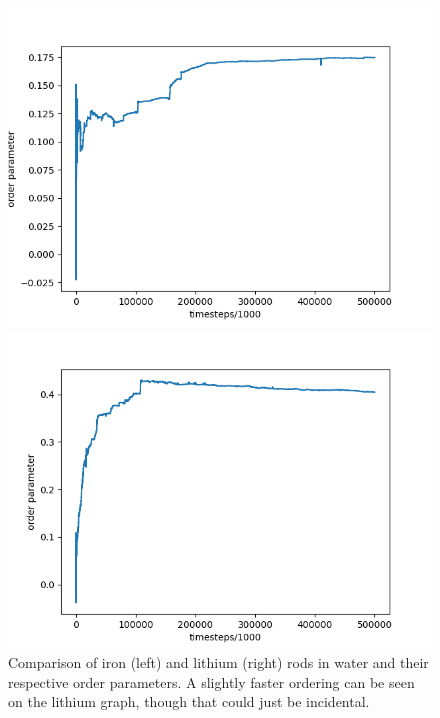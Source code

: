 \begin{figure}[h]
\begin{minipage}[tc]{0.50\textwidth}
    \hspace{-0.2\textwidth}
    \includegraphics[width=1.3\textwidth]{data/med_comp2_L.png}
  \end{minipage}
  \hfill
  \begin{minipage}[tc]{0.50\textwidth}
    \includegraphics[width=1.3\textwidth]{data/med_comp2_R.png}
  \end{minipage}
    \caption{Comparison of iron (left) and lithium (right) rods in water and their respective order parameters. A slightly faster ordering can be seen on the lithium graph, though that could just be incidental.}
  \label{fig:med_comp2}
\end{figure}

